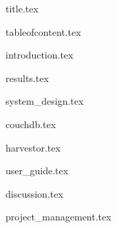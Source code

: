 \documentclass[a4paper, 11pt]{article}
\begin{document}
\thispagestyle{empty}
\thispagestyle{empty}

{title.tex}

{tableofcontent.tex}

\setcounter{page}{1}

{introduction.tex}

{results.tex}

{system_design.tex}

{couchdb.tex}

{harvestor.tex}

{user_guide.tex}

{discussion.tex}

{project_management.tex}

\newpage
\printbibliography
 
\end{document}
